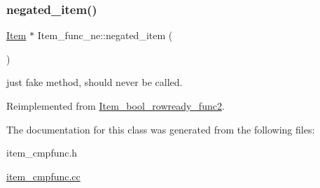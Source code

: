 \mbox{\label{classItem__func__ne_a2ea1a7165722dac5d173f1cff8b920ef}} 
\subsubsection{\texorpdfstring{negated\+\_\+item()}{negated\_item()}}
{\footnotesize\ttfamily \mbox{\hyperlink{classItem}{Item}} $\ast$ Item\+\_\+func\+\_\+ne\+::negated\+\_\+item (\begin{DoxyParamCaption}{ }\end{DoxyParamCaption})\hspace{0.3cm}{\ttfamily [virtual]}}

just fake method, should never be called. 

Reimplemented from \mbox{\hyperlink{classItem__bool__rowready__func2_a93c59c6f9aa848020c85975f792ba85a}{Item\+\_\+bool\+\_\+rowready\+\_\+func2}}.



The documentation for this class was generated from the following files\+:\begin{DoxyCompactItemize}
\item 
item\+\_\+cmpfunc.\+h\item 
\mbox{\hyperlink{item__cmpfunc_8cc}{item\+\_\+cmpfunc.\+cc}}\end{DoxyCompactItemize}
